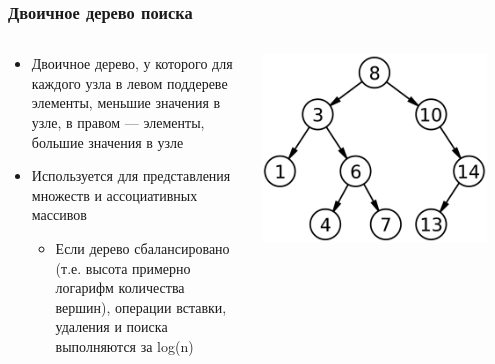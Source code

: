 \documentclass[xetex,mathserif,serif]{beamer}
\begin{document}
	\begin{frame}
		\frametitle{Двоичное дерево поиска}
		\begin{columns}
			\begin{column}{0.6\textwidth}
				\begin{itemize}
					\item Двоичное дерево, у которого для каждого узла в левом поддереве элементы, меньшие значения в узле, в правом --- элементы, большие значения в узле
					\item Используется для представления множеств и ассоциативных массивов
					\begin{itemize}
						\item Если дерево сбалансировано (т.е. высота примерно логарифм количества вершин), операции вставки, удаления и поиска выполняются за log(n)
					\end{itemize}
				\end{itemize}
			\end{column}
			\begin{column}{0.4\textwidth}
				\begin{center}
					\includegraphics[width=0.9\textwidth]{bst.png}
				\end{center}
			\end{column}
		\end{columns}
	\end{frame}
\end{document}
